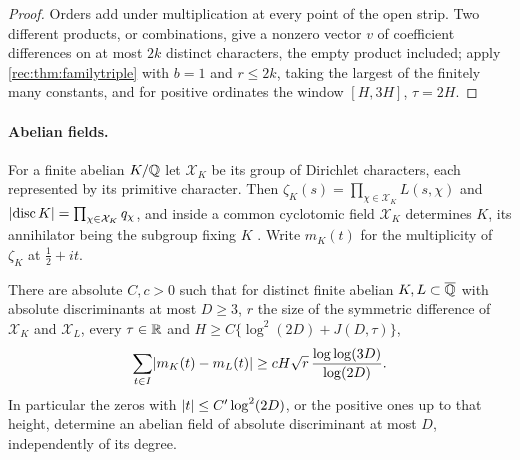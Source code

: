 \begin{proof}
Orders add under multiplication at every point of the open strip. Two different products, or
combinations, give a nonzero vector $v$ of coefficient differences on at most $2k$ distinct characters,
the empty product included; apply \cref{rec:thm:familytriple} with $b=1$ and $r\le2k$, taking the largest
of the finitely many constants, and for positive ordinates the window $[H,3H]$, $\tau=2H$.
\end{proof}

\paragraph{Abelian fields.}
For a finite abelian $K/\mathbb{Q}$ let $\mathcal X_K$ be its group of Dirichlet characters, each represented by
its primitive character. Then $\zeta_K(s)=\prod_{\chi\in\mathcal X_K}L(s,\chi)$ and
$\lvert\operatorname{disc}K\rvert=\prod_{\chi\in\mathcal X_K}q_\chi$, and inside a common cyclotomic field $\mathcal X_K$ determines $K$, its
annihilator being the subgroup fixing $K$ \cite{Washington1997Introduction}. Write $m_K(t)$ for the
multiplicity of $\zeta_K$ at $\tfrac12+it$.

\begin{theorem}\label{rec:thm:fields}
There are absolute $C,c>0$ such that for distinct finite abelian $K,L\subset\overline{\mathbb{Q}}$ with absolute
discriminants at most $D\ge3$, $r$ the size of the symmetric difference of $\mathcal X_K$ and $\mathcal X_L$, every
$\tau\in\mathbb{R}$ and $H\ge C\{\log^2(2D)+J(D,\tau)\}$,
\[
 \sum_{t\in I}\lvert m_K(t)-m_L(t)\rvert\ge cH\sqrt r\,\frac{\log\log(3D)}{\log(2D)} .
\]
In particular the zeros with $\lvert t\rvert\le C'\log^2(2D)$, or the positive ones up to that height,
determine an abelian field of absolute discriminant at most $D$, independently of its degree.
\end{theorem}


